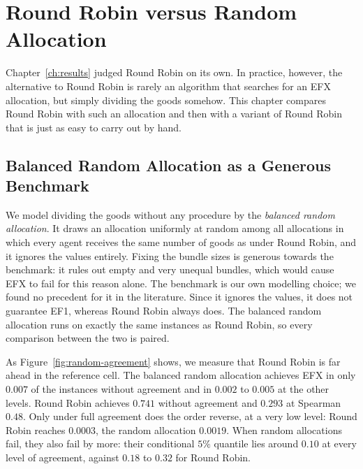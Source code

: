\chapter{Round Robin versus Random Allocation}\label{ch:random}

Chapter~\ref{ch:results} judged Round Robin on its own. In practice, however, the alternative to
Round Robin is rarely an algorithm that searches for an EFX allocation, but simply dividing the
goods somehow. This chapter compares Round Robin with such an allocation and then with a variant
of Round Robin that is just as easy to carry out by hand.

\section{Balanced Random Allocation as a Generous Benchmark}\label{sec:random}

We model dividing the goods without any procedure by the \textit{balanced random allocation}.
It draws an allocation uniformly at random among all allocations in which every agent receives
the same number of goods as under Round Robin, and it ignores the values entirely. Fixing the
bundle sizes is generous towards the benchmark: it rules out empty and very unequal bundles,
which would cause EFX to fail for this reason alone. The benchmark is our own modelling choice;
we found no precedent for it in the literature. Since it ignores the values, it does not
guarantee EF1, whereas Round Robin always does. The balanced random allocation runs on exactly the
same instances as Round Robin, so every comparison between the two is paired.

As Figure~\ref{fig:random-agreement} shows, we measure that Round Robin is far ahead in the reference cell. The
balanced random allocation achieves EFX in only $0.007$ of the instances without agreement and
in $0.002$ to $0.005$ at the other levels. Round Robin achieves $0.741$ without agreement and
$0.293$ at Spearman $0.48$. Only under full agreement does the order reverse, at a very low level:
Round Robin reaches $0.0003$, the random allocation $0.0019$. When random allocations fail, they
also fail by more: their conditional $5\%$ quantile lies around $0.10$ at every level of
agreement, against $0.18$ to $0.32$ for Round Robin.

